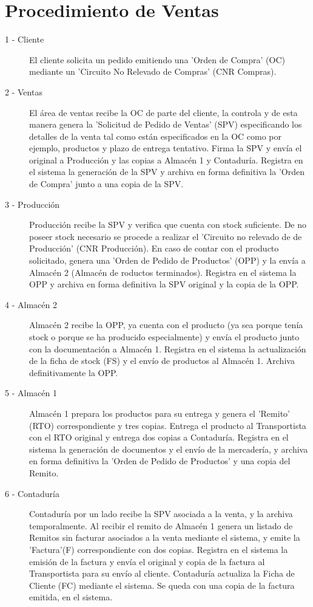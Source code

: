 \section{Procedimiento de Ventas}
 \begin{description}
	\item[1 - Cliente] El cliente solicita un pedido emitiendo una 'Orden de Compra' (OC) mediante un 'Circuito No Relevado de Compras' (CNR Compras).
	\item[2 - Ventas] El \'area de ventas recibe la OC de parte del cliente, la controla y de esta manera genera la 'Solicitud de Pedido de Ventas' (SPV) especificando los detalles de la venta tal como est\'an especificados en la OC como por ejemplo, productos y plazo de entrega tentativo. Firma la SPV y env\'ia el original a Producci\'on y las copias a Almac\'en 1 y Contadur\'ia. Registra en el sistema la generaci\'on de la SPV y archiva en forma definitiva la 'Orden de Compra' junto a una copia de la SPV.
	\item[3 - Producci\'on] Producci\'on recibe la SPV y verifica que cuenta con stock suficiente. De no poseer stock necesario se procede a realizar el 'Circuito no relevado de de Producci\'on' (CNR Producci\'on). En caso de contar con el producto solicitado, genera una 'Orden de Pedido de Productos' (OPP) y la env\'ia a Almac\'en 2 (Almac\'en de roductos terminados).  Registra en el sistema la OPP y archiva en forma definitiva la SPV original y la copia de la OPP. 
	\item[4 - Almac\'en 2] Almac\'en 2 recibe la OPP, ya cuenta con el producto (ya sea porque ten\'ia stock o porque se ha producido especialmente) y env\'ia el producto junto con la documentaci\'on a Almac\'en 1. Registra en el sistema la actualización de la ficha de stock (FS) y el envío de productos al Almac\'en 1. Archiva definitivamente la OPP.
	\item[5 - Almac\'en 1] Almac\'en 1 prepara los productos para su entrega y genera el 'Remito' (RTO) correspondiente y tres copias. Entrega el producto al Transportista con el RTO original y entrega dos copias a Contadur\'ia. Registra en el sistema la generación de documentos y el env\'io de la mercader\'ia, y archiva en forma definitiva la 'Orden de Pedido de Productos' y una copia del Remito.
	\item[6 - Contadur\'ia] Contadur\'ia por un lado recibe la SPV asociada a la venta, y la archiva temporalmente. Al recibir el remito de Almac\'en 1 genera un listado de Remitos sin facturar asociados a la venta mediante el sistema, y emite la 'Factura'(F) correspondiente con dos copias. Registra en el sistema la emisi\'on de la factura y env\'ia el original y copia de la factura al Transportista para su env\'io al cliente. Contadur\'ia actualiza la Ficha de Cliente (FC) mediante el sistema. Se queda con una copia de la factura emitida, en el sistema.

\end{description}
